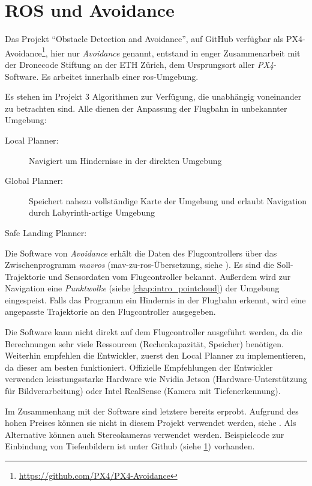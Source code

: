 \section{ROS und Avoidance}
Das Projekt \enquote{Obstacle Detection and Avoidance}\cite{dronecodestiftungObstacleDetectionAvoidance2023}, auf GitHub verfügbar als PX4-Avoidance\footnote{\label{note1}\url{https://github.com/PX4/PX4-Avoidance}}, hier nur \textit{Avoidance} genannt, entstand in enger Zusammenarbeit mit der Dronecode Stiftung an der ETH Zürich, dem Ursprungsort aller \textit{PX4}-Software. Es arbeitet innerhalb einer \acrshort{ros}-Umgebung.

Es stehen im Projekt 3 Algorithmen zur Verfügung, die unabhängig voneinander zu betrachten sind. Alle dienen der Anpassung der Flugbahn in unbekannter Umgebung:
\begin{description}
    \item[Local Planner:] Navigiert um Hindernisse in der direkten Umgebung
    \item[Global Planner:] Speichert nahezu vollständige Karte der Umgebung und erlaubt Navigation durch Labyrinth-artige Umgebung
    \item[Safe Landing Planner:]
\end{description}

Die Software von \textit{Avoidance} erhält die Daten des Flugcontrollers über das Zwischenprogramm \textit{mavros} (\acrshort{mav}-zu-\acrshort{ros}-Übersetzung, siehe \cite[Kapitel 5.2/5.4]{markusreinErweiterungBestehenderDrohnen2023}). Es sind die Soll-Trajektorie und Sensordaten vom Flugcontroller bekannt. Außerdem wird zur Navigation eine \textit{Punktwolke} (siehe \cref*{chap:intro_pointcloud}) der Umgebung eingespeist. Falls das Programm ein Hindernis in der Flugbahn erkennt, wird eine angepasste Trajektorie an den Flugcontroller ausgegeben.

Die Software kann nicht direkt auf dem Flugcontroller ausgeführt werden, da die Berechnungen sehr viele Ressourcen (Rechenkapazität, Speicher) benötigen. Weiterhin empfehlen die Entwickler, zuerst den Local Planner zu implementieren, da dieser am besten funktioniert. Offizielle Empfehlungen der Entwickler verwenden leisstungsstarke Hardware wie Nvidia Jetson (Hardware-Unterstützung für Bildverarbeitung) oder Intel RealSense (Kamera mit Tiefenerkennung).

Im Zusammenhang mit der Software sind letztere bereits erprobt. Aufgrund des hohen Preises können sie nicht in diesem Projekt verwendet werden, siehe \cite[Kapitel 4.3.8]{wirthErweiterungBestehendenDrohne2022}. Als Alternative können auch Stereokameras verwendet werden. Beispielcode zur Einbindung von Tiefenbildern ist unter Github (siehe \cref{note1}) vorhanden. 

